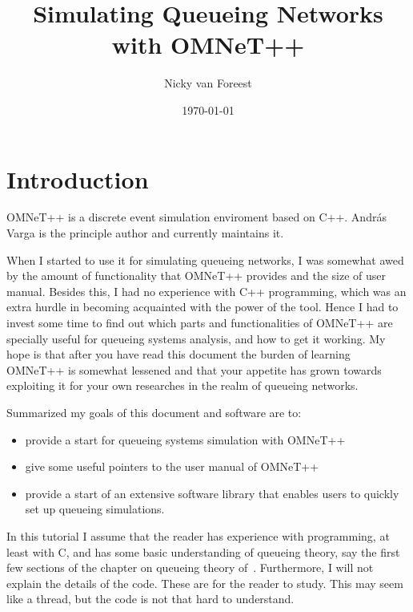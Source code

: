 \documentclass[a4paper]{article}
\date{\today}
\author{Nicky van Foreest}
\title{Simulating Queueing Networks with OMNeT++}
\begin{document}
\maketitle {}
\tableofcontents

\section{Introduction}
\label{sec:introduction}
OMNeT++ is a discrete event simulation enviroment based on C++. Andr{\'a}s
Varga is the principle author and  currently maintains it.

 When I
started to use it for simulating queueing networks, I was somewhat
awed by the amount of functionality that OMNeT++ provides and the size
of user manual. Besides this, I had no experience with C++
programming, which was an extra hurdle in becoming acquainted with the
power of the tool. Hence I had to invest some time to find out which
parts and functionalities of OMNeT++ are specially useful for queueing
systems analysis, and how to get it working. My hope is that after you
have read this document the burden of learning OMNeT++ is somewhat
lessened and that your appetite has grown towards exploiting it for
your own researches in the realm of queueing networks.

Summarized my goals of this document and software are to:
\begin{itemize}
\item provide a start for queueing systems simulation with OMNeT++
\item give some useful pointers to the user manual of OMNeT++
\item provide a start of an extensive software library that enables
  users to quickly set up queueing simulations.
\end{itemize}

In this tutorial I assume that the reader has experience with
programming, at least with C, and has some basic understanding of
queueing theory, say the first few sections of the chapter on queueing
theory of~\cite{Ross93}.  Furthermore, I will not explain the details
of the code. These are  for the reader to study. This may seem like a
thread, but the code is not that hard to understand.
\end{document}

